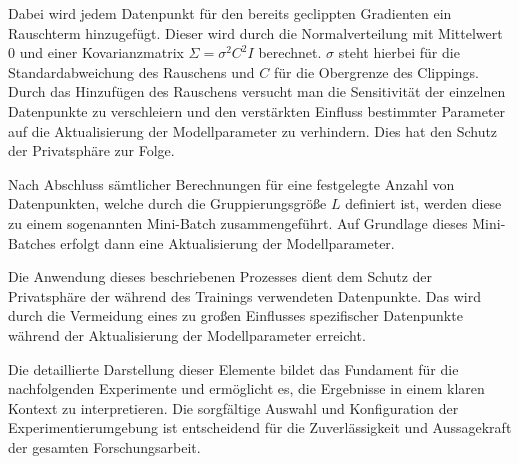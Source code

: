 Dabei wird jedem Datenpunkt für den bereits \glqq geclippten\grqq{} Gradienten ein Rauschterm hinzugefügt. Dieser wird durch die Normalverteilung mit Mittelwert 0 und einer Kovarianzmatrix $\Sigma = \sigma^2C^2I $ berechnet. $\sigma$ steht hierbei für die Standardabweichung des Rauschens und $C$ für die Obergrenze des Clippings. Durch das Hinzufügen des Rauschens versucht man die Sensitivität der einzelnen Datenpunkte zu verschleiern und den verstärkten Einfluss bestimmter Parameter auf die Aktualisierung der Modellparameter zu verhindern. Dies hat den Schutz der Privatsphäre zur Folge.

Nach Abschluss sämtlicher Berechnungen für eine festgelegte Anzahl von Datenpunkten, welche durch die Gruppierungsgröße $L$ definiert ist, werden diese zu einem sogenannten Mini-Batch zusammengeführt. Auf Grundlage dieses Mini-Batches erfolgt dann eine Aktualisierung der Modellparameter.

Die Anwendung dieses beschriebenen Prozesses dient dem Schutz der Privatsphäre der während des Trainings verwendeten Datenpunkte. Das wird durch die Vermeidung eines zu großen Einflusses spezifischer Datenpunkte während der Aktualisierung der Modellparameter erreicht.

Die detaillierte Darstellung dieser Elemente bildet das Fundament für die nachfolgenden Experimente und ermöglicht es, die Ergebnisse in einem klaren Kontext zu interpretieren. Die sorgfältige Auswahl und Konfiguration der Experimentierumgebung ist entscheidend für die Zuverlässigkeit und Aussagekraft der gesamten Forschungsarbeit.